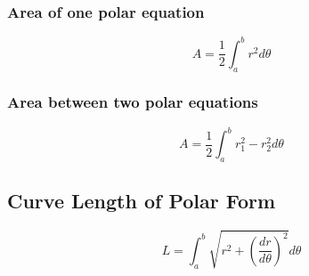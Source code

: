 \subsubsection{Area of one polar equation}
\begin{equation}
    A=\frac{1}{2}\int^b_ar^2d\theta
\end{equation}
\subsubsection{Area between two polar equations}
\begin{equation}
    A=\frac{1}{2}\int^b_ar_1^2-r_2^2d\theta
\end{equation}

\subsection{Curve Length of Polar Form}
\begin{equation}
    L=\int^b_a\sqrt{r^2+\left(\frac{dr}{d\theta}\right)^2}d\theta
\end{equation}